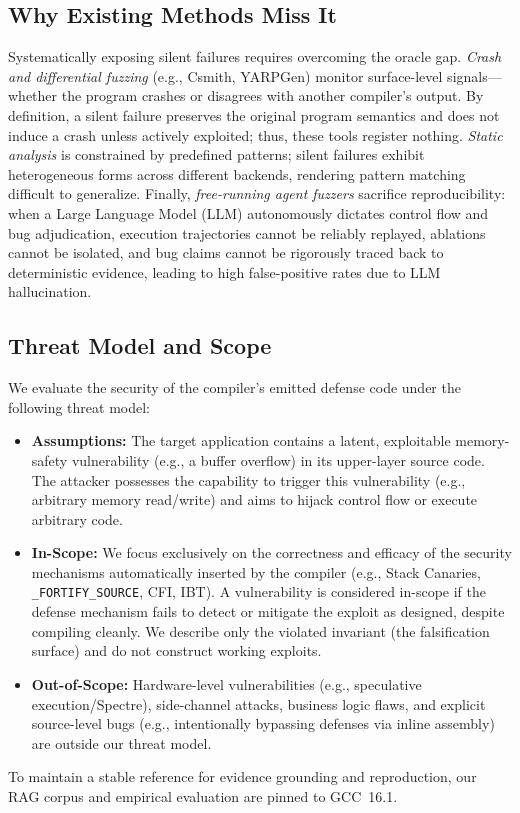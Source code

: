 \documentclass[conference]{IEEEtran}
\begin{document}
\subsection{Why Existing Methods Miss It}
Systematically exposing silent failures requires overcoming the oracle gap.
\emph{Crash and differential fuzzing} (e.g., Csmith, YARPGen) monitor surface-level signals---whether the program crashes or disagrees with another compiler's output. By definition, a silent failure preserves the original program semantics and does not induce a crash unless actively exploited; thus, these tools register nothing. \emph{Static analysis} is constrained by predefined patterns; silent failures exhibit heterogeneous forms across different backends, rendering pattern matching difficult to generalize. Finally, \emph{free-running agent fuzzers} sacrifice reproducibility: when a Large Language Model (LLM) autonomously dictates control flow and bug adjudication, execution trajectories cannot be reliably replayed, ablations cannot be isolated, and bug claims cannot be rigorously traced back to deterministic evidence, leading to high false-positive rates due to LLM hallucination.

\subsection{Threat Model and Scope}
We evaluate the security of the compiler's emitted defense code under the following threat model:
\begin{itemize}
    \item \textbf{Assumptions:} The target application contains a latent, exploitable memory-safety vulnerability (e.g., a buffer overflow) in its upper-layer source code. The attacker possesses the capability to trigger this vulnerability (e.g., arbitrary memory read/write) and aims to hijack control flow or execute arbitrary code.
    \item \textbf{In-Scope:} We focus exclusively on the correctness and efficacy of the security mechanisms automatically inserted by the compiler (e.g., Stack Canaries, \texttt{\_FORTIFY\_SOURCE}, CFI, IBT). A vulnerability is considered in-scope if the defense mechanism fails to detect or mitigate the exploit as designed, despite compiling cleanly. We describe only the violated invariant (the falsification surface) and do not construct working exploits.
    \item \textbf{Out-of-Scope:} Hardware-level vulnerabilities (e.g., speculative execution/Spectre), side-channel attacks, business logic flaws, and explicit source-level bugs (e.g., intentionally bypassing defenses via inline assembly) are outside our threat model.
\end{itemize}
To maintain a stable reference for evidence grounding and reproduction, our RAG corpus and empirical evaluation are pinned to GCC~16.1.
\end{document}
